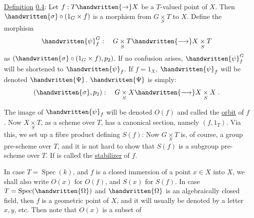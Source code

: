 
\uline{Definition} \uline{0.4}: Let $f:T\handwritten{\to}X$ be a $T$-valued point of $X$. Then $\handwritten{\sigma}\circ(1_G\times f)$ is a morphism from $G\underset{S}{\times}T$ to $X$. Define the morphism
\[
\handwritten{\psi}^{G}_{f}:\quad G\underset{S}{\times}T\handwritten{\longrightarrow} X\underset{S}{\times}T
\]
as $(\handwritten{\sigma}\circ(1_G\times f),p_2)$. If no confusion arises, $\handwritten{\psi}^{G}_{f}$ will be shortened to $\handwritten{\psi}_f$. If $f=1_X$, $\handwritten{\psi}_f$ will be denoted $\handwritten{\Psi}$. $\handwritten{\Psi}$ is simply:
\[
(\handwritten{\sigma},p_2):\quad G\underset{S}{\times}X\handwritten{\longrightarrow}X\underset{S}{\times}X\;.
\]

The image of $\handwritten{\psi}_f$ will be denoted $O(f)$ and called the \uline{orbit} of $f$. Now $X\underset{S}{\times}T$, as a scheme over $T$, has a canonical section, namely $(f,1_T)$. Via this, we set up a fibre product defining $S(f)$:
Now $G\underset{S}{\times}T$ is, of course, a group pre-scheme over $T$, and it is not hard to show that $S(f)$ is a subgroup pre-scheme over $T$. If is called the \uline{stabilizer} of $f$.

In case $T=\operatorname{Spec}(k)$, and $f$ is a closed immersion of a point $x\in X$ into $X$, we shall also write $O(x)$ for $O(f)$, and $S(x)$ for $S(f)$. In case $T=\operatorname{Spec}(\handwritten{\Omega})$ and $\handwritten{\Omega}$ is an algebraically closed field, then $f$ is a geometric point of $X$, and it will usually be denoted by a letter $x,y$, etc. Then note that $O(x)$ is a subset of
